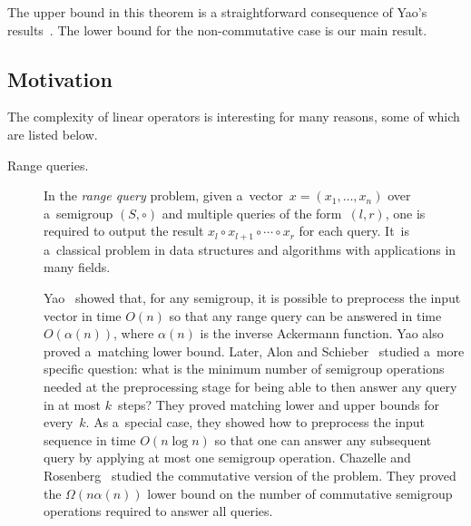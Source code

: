 \documentclass{toc}
\begin{document}
The upper bound in this theorem
is a straightforward consequence of Yao's results~\cite{DBLP:conf/stoc/Yao82}.
The  %
lower bound %
for the non-commutative case is our main result.  %

\subsection{Motivation}
The complexity of linear operators is interesting for many reasons, some of
which are listed below.

\begin{description}
\item[Range queries.] In the
\emph{range query} problem,
 given a~vector~$x=(x_1, \dotsc, x_n)$ over a~semigroup $(S, \circ)$ and
multiple queries of the form~$(l,r)$, one is required to
output the result $x_l \circ x_{l+1} \circ \dotsb \circ x_r$
for each query. It~is a~classical problem in data structures and
algorithms with applications in many fields.

Yao~\cite{DBLP:conf/stoc/Yao82} showed that, for any semigroup, it is possible
to preprocess the input vector in time $O(n)$ so that
any range query can be answered %
in time $O(\alpha(n))$, where $\alpha(n)$ is the inverse Ackermann
function.  Yao also  %
proved a~matching lower bound.
Later, Alon and
Schieber~\cite{Alon87optimalpreprocessing} studied a~more specific question:
what is the minimum number of semigroup operations needed at the preprocessing
stage for being able to then answer any query in at most $k$~steps? They proved
matching lower and upper bounds for every~$k$. As a~special case, they showed
how to preprocess the input sequence in time $O(n\log n)$
so that one can %
answer any
subsequent query by applying at most one semigroup operation.
Chazelle and Rosenberg~\cite{DBLP:journals/ijcga/ChazelleR91} studied the
commutative version of the problem. They proved the $\Omega(n \alpha(n))$ lower
bound on the number of commutative semigroup operations required to answer all
queries.


\end{description}
\end{document}

